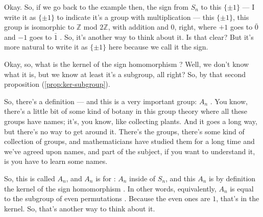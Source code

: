 \begin{speech}[00:27:01 - 00:29:18]
Okay. So, if we go back to the example then, the sign from $S_n$ to this $\{\pm 1\}$  --- I write it as $\{\pm 1\}$ to indicate it's a group with multiplication --- this $\{\pm 1\}$, this group is isomorphic to $\mathbb{Z}$ mod $2\mathbb{Z}$, with addition and $0$, right, where $+1$ goes to $\bar{0}$ and $-1$ goes to $\bar{1}$ . So, it's another way to think about it. Is that clear? But it's more natural to write it as $\{\pm 1\}$ here because we call it the sign.

Okay, so, what is the kernel of the sign homomorphism ? Well, we don't know what it is, but we know at least it's a subgroup, all right? So, by that second proposition (\cref{prop:ker-subgroup}).

So, there's a definition --- and this is a very important group: $A_n$ . You know, there's a little bit of some kind of botany in this group theory where all these groups have names; it's, you know, like collecting plants. And it goes a long way, but there's no way to get around it. There's the groups, there's some kind of collection of groups, and mathematicians have studied them for a long time and we've agreed upon names, and part of the subject, if you want to understand it, is you have to learn some names.

So, this is called $A_n$, and $A_n$ is for : $A_n$ inside of $S_n$, and this $A_n$ is by definition the kernel of the sign homomorphism . In other words, equivalently, $A_n$ is equal to the subgroup of even permutations . Because the even ones are $1$, that's in the kernel. So, that's another way to think about it.
\end{speech}

